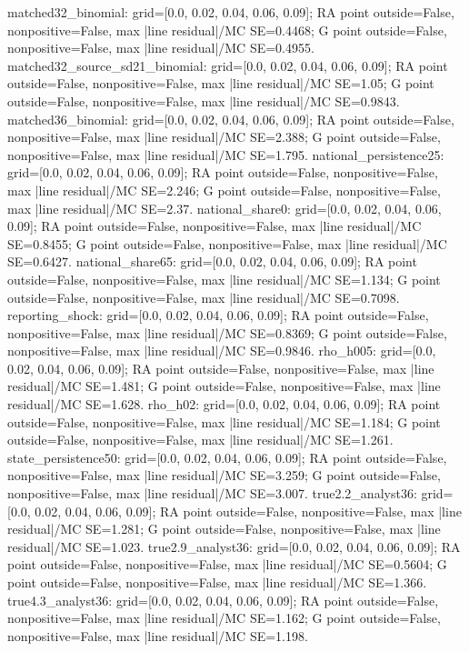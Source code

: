 \begin{table}[htbp]
\begin{minipage}{\linewidth}
matched32\_\allowbreak{}binomial: grid=[0.0, 0.02, 0.04, 0.06, 0.09]; RA point outside=False, nonpositive=False, max |line residual|/MC SE=0.4468; G point outside=False, nonpositive=False, max |line residual|/MC SE=0.4955. matched32\_\allowbreak{}source\_\allowbreak{}sd21\_\allowbreak{}binomial: grid=[0.0, 0.02, 0.04, 0.06, 0.09]; RA point outside=False, nonpositive=False, max |line residual|/MC SE=1.05; G point outside=False, nonpositive=False, max |line residual|/MC SE=0.9843. matched36\_\allowbreak{}binomial: grid=[0.0, 0.02, 0.04, 0.06, 0.09]; RA point outside=False, nonpositive=False, max |line residual|/MC SE=2.388; G point outside=False, nonpositive=False, max |line residual|/MC SE=1.795. national\_\allowbreak{}persistence25: grid=[0.0, 0.02, 0.04, 0.06, 0.09]; RA point outside=False, nonpositive=False, max |line residual|/MC SE=2.246; G point outside=False, nonpositive=False, max |line residual|/MC SE=2.37. national\_\allowbreak{}share0: grid=[0.0, 0.02, 0.04, 0.06, 0.09]; RA point outside=False, nonpositive=False, max |line residual|/MC SE=0.8455; G point outside=False, nonpositive=False, max |line residual|/MC SE=0.6427. national\_\allowbreak{}share65: grid=[0.0, 0.02, 0.04, 0.06, 0.09]; RA point outside=False, nonpositive=False, max |line residual|/MC SE=1.134; G point outside=False, nonpositive=False, max |line residual|/MC SE=0.7098. reporting\_\allowbreak{}shock: grid=[0.0, 0.02, 0.04, 0.06, 0.09]; RA point outside=False, nonpositive=False, max |line residual|/MC SE=0.8369; G point outside=False, nonpositive=False, max |line residual|/MC SE=0.9846. rho\_\allowbreak{}h005: grid=[0.0, 0.02, 0.04, 0.06, 0.09]; RA point outside=False, nonpositive=False, max |line residual|/MC SE=1.481; G point outside=False, nonpositive=False, max |line residual|/MC SE=1.628. rho\_\allowbreak{}h02: grid=[0.0, 0.02, 0.04, 0.06, 0.09]; RA point outside=False, nonpositive=False, max |line residual|/MC SE=1.184; G point outside=False, nonpositive=False, max |line residual|/MC SE=1.261. state\_\allowbreak{}persistence50: grid=[0.0, 0.02, 0.04, 0.06, 0.09]; RA point outside=False, nonpositive=False, max |line residual|/MC SE=3.259; G point outside=False, nonpositive=False, max |line residual|/MC SE=3.007. true2.2\_\allowbreak{}analyst36: grid=[0.0, 0.02, 0.04, 0.06, 0.09]; RA point outside=False, nonpositive=False, max |line residual|/MC SE=1.281; G point outside=False, nonpositive=False, max |line residual|/MC SE=1.023. true2.9\_\allowbreak{}analyst36: grid=[0.0, 0.02, 0.04, 0.06, 0.09]; RA point outside=False, nonpositive=False, max |line residual|/MC SE=0.5604; G point outside=False, nonpositive=False, max |line residual|/MC SE=1.366. true4.3\_\allowbreak{}analyst36: grid=[0.0, 0.02, 0.04, 0.06, 0.09]; RA point outside=False, nonpositive=False, max |line residual|/MC SE=1.162; G point outside=False, nonpositive=False, max |line residual|/MC SE=1.198.
\end{minipage}
\end{table}
